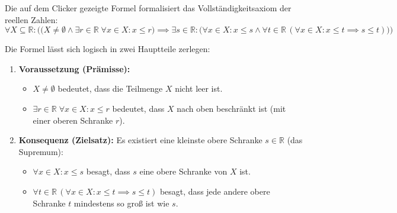 \begin{math-stroke}
Die auf dem Clicker gezeigte Formel formalisiert das Vollständigkeitsaxiom der reellen Zahlen:
\begin{equation}
\label{eq:vollstaendigkeit}
\forall X \subseteq \mathbb{R} \colon \Big( \bigl( X \neq \emptyset \land \exists r \in \mathbb{R} \; \forall x \in X \colon x \le r \bigr) \implies \exists s \in \mathbb{R} \colon \bigl( \forall x \in X \colon x \le s \land \forall t \in \mathbb{R} \, (\forall x \in X \colon x \le t \implies s \le t) \bigr) \Big)
\end{equation}

\begin{explanation-of-steps}
Die Formel lässt sich logisch in zwei Hauptteile zerlegen:
\begin{enumerate}[label=\textbf{\arabic*.}]
    \item \textbf{Voraussetzung (Prämisse):} 
    \begin{itemize}
        \item $X \neq \emptyset$ bedeutet, dass die Teilmenge $X$ nicht leer ist.
        \item $\exists r \in \mathbb{R} \; \forall x \in X \colon x \le r$ bedeutet, dass $X$ nach oben beschränkt ist (mit einer oberen Schranke $r$).
    \end{itemize}
    \item \textbf{Konsequenz (Zielsatz):} Es existiert eine kleinste obere Schranke $s \in \mathbb{R}$ (das Supremum):
    \begin{itemize}
        \item $\forall x \in X \colon x \le s$ besagt, dass $s$ eine obere Schranke von $X$ ist.
        \item $\forall t \in \mathbb{R} \, (\forall x \in X \colon x \le t \implies s \le t)$ besagt, dass jede andere obere Schranke $t$ mindestens so groß ist wie $s$.
    \end{itemize}
\end{enumerate}
\end{explanation-of-steps}
\end{math-stroke}

